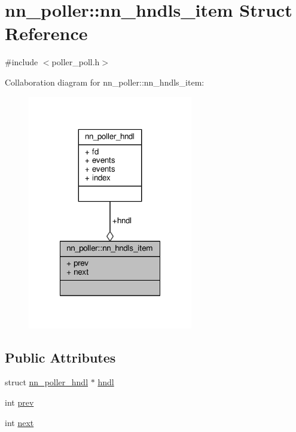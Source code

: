 \hypertarget{structnn__poller_1_1nn__hndls__item}{}\section{nn\+\_\+poller\+:\+:nn\+\_\+hndls\+\_\+item Struct Reference}
\label{structnn__poller_1_1nn__hndls__item}


{\ttfamily \#include $<$poller\+\_\+poll.\+h$>$}



Collaboration diagram for nn\+\_\+poller\+:\+:nn\+\_\+hndls\+\_\+item\+:\nopagebreak
\begin{figure}[H]
\begin{center}
\leavevmode
\includegraphics[width=204pt]{structnn__poller_1_1nn__hndls__item__coll__graph}
\end{center}
\end{figure}
\subsection*{Public Attributes}
\begin{DoxyCompactItemize}
\item 
struct \hyperlink{structnn__poller__hndl}{nn\+\_\+poller\+\_\+hndl} $\ast$ \hyperlink{structnn__poller_1_1nn__hndls__item_a0255d9a6f887fe0cd2a0363fb517f84e}{hndl}
\item 
int \hyperlink{structnn__poller_1_1nn__hndls__item_a7d9970256d55c4c0d7832e2d759682eb}{prev}
\item 
int \hyperlink{structnn__poller_1_1nn__hndls__item_a00d334ecc01f3fb24fb117cdb5242215}{next}
\end{DoxyCompactItemize}


